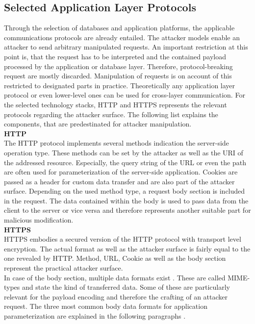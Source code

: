 \subsection{Selected Application Layer Protocols}
\label{sec:selectedAppLayerProtocols}
Through the selection of databases and application platforms, the applicable communications protocols are already entailed. The attacker models enable an attacker to send arbitrary manipulated requests. An important restriction at this point is, that the request has to be interpreted and the contained payload processed by the application or database layer. Therefore, protocol-breaking request are mostly discarded. Manipulation of requests is on account of this restricted to designated parts in practice. Theoretically any application layer protocol or even lower-level ones can be used for cross-layer communication. For the selected technology stacks, HTTP and HTTPS represents the relevant protocols regarding the attacker surface. The following list explains the components, that are predestinated for attacker manipulation. \\

\textbf{HTTP}\\
The HTTP protocol implements several methods indication the server-side operation type. These methods can be set by the attacker as well as the URI of the addressed resource. Especially, the query string of the URL or even the path are often used for parameterization of the server-side application. Cookies are passed as a header for custom data transfer and are also part of the attacker surface. Depending on the used method type, a request body section is included in the request. The data contained within the body is used to pass data from the client to the server or vice versa and therefore represents another suitable part for malicious modification. \\

\textbf{HTTPS}\\
HTTPS embodies a secured version of the HTTP protocol with transport level encryption. The actual format as well as the attacker surface is fairly equal to the one revealed by HTTP. Method, URL, Cookie as well as the body section represent the practical attacker surface. \\

In case of the body section, multiple data formats exist \cite{Freed1996a}. These are called MIME-types and state the kind of transferred data. Some of these are particularly relevant for the payload encoding and therefore the crafting of an attacker request. The three most common body data formats for application parameterization are explained in the following paragraphs \cite{Freed2016}.\\

